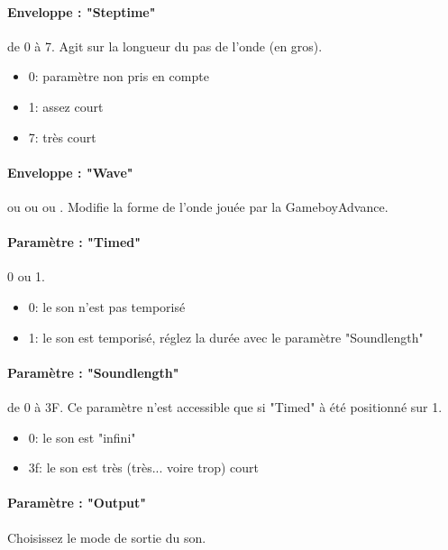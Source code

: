\paragraph{Enveloppe : "Steptime"} de 0 à 7.
Agit sur la longueur du pas de l'onde (en gros).
\medskip

\begin{itemize}
    \item{0: paramètre non pris en compte}
    \item{1: assez court}
    \item{7: très court}
\end{itemize}

\paragraph{Enveloppe : "Wave"}  ou  ou  ou .
Modifie la forme de l'onde jouée par la GameboyAdvance.

\paragraph{Paramètre : "Timed"} 0 ou 1.
\medskip

\begin{itemize}
    \item{0: le son n'est pas temporisé}
    \item{1: le son est temporisé, réglez la durée avec le paramètre "Soundlength"}
\end{itemize}

\paragraph{Paramètre : "Soundlength"} de 0 à 3F.
Ce paramètre n'est accessible que si "Timed" à été positionné sur 1.
\medskip

\begin{itemize}
    \item{0: le son est "infini"}
    \item{3f: le son est très (très... voire trop) court}
\end{itemize}

\paragraph{Paramètre : "Output"} Choisissez le mode de sortie du son.
\medskip

